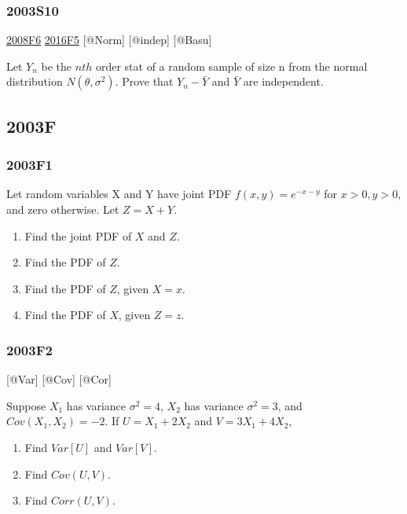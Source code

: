 \documentclass[6pt,Portrait]{article}
\begin{document}
\hypertarget{s10}{%
\subsubsection{2003S10}\label{s10}}

\protect\hyperlink{f6-3}{2008F6} \protect\hyperlink{f5-6}{2016F5}
{[}@Norm{]} {[}@indep{]} {[}@Basu{]}

Let \(Y_n\) be the \(n{th}\) order stat of a random sample of size n
from the normal distribution \(N(\theta,\sigma^2)\). Prove that
\(Y_n-\bar Y\) and \(\bar Y\) are independent.

\hypertarget{f-1}{%
\subsection{2003F}\label{f-1}}

\hypertarget{f1-1}{%
\subsubsection{2003F1}\label{f1-1}}

Let random variables X and Y have joint PDF \(f(x,y)=e^{-x-y}\) for
\(x>0, y>0\), and zero otherwise. Let \(Z=X+Y\).

\begin{enumerate}
\def\labelenumi{\Alph{enumi})}
\item
  Find the joint PDF of \(X\) and \(Z\).
\item
  Find the PDF of \(Z\).
\item
  Find the PDF of \(Z\), given \(X=x\).
\item
  Find the PDF of \(X\), given \(Z=z\).
\end{enumerate}

\hypertarget{f2-1}{%
\subsubsection{2003F2}\label{f2-1}}

{[}@Var{]} {[}@Cov{]} {[}@Cor{]}

Suppose \(X_1\) has variance \(\sigma^2=4\), \(X_2\) has variance
\(\sigma^2=3\), and \(Cov(X_1,X_2)=-2\). If \(U=X_1+2X_2\) and
\(V= 3X_1+4X_2\),

\begin{enumerate}
\def\labelenumi{\Alph{enumi})}
\item
  Find \(Var[U]\) and \(Var[V]\).
\item
  Find \(Cov(U,V)\).
\item
  Find \(Corr(U,V)\).
\end{enumerate}
\end{document}
